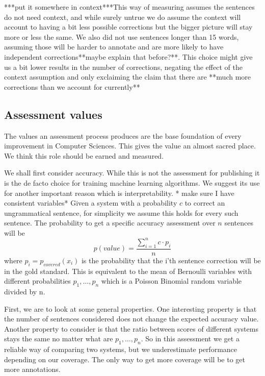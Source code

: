\documentclass[11pt]{article}
\begin{document}
{*}{*}{*}put it somewhere in context{*}{*}{*}This way of measuring
assumes the sentences do not need context, and while surely untrue
we do assume the context will account to having a bit less possible
corrections but the bigger picture will stay more or less the same.
We also did not use sentences longer than 15 words, assuming those
will be harder to annotate and are more likely to have independent
corrections{*}{*}maybe explain that before?{*}{*}. This choice might
give us a bit lower results in the number of corrections, negating
the effect of the context assumption and only exclaiming the claim
that there are {*}{*}much more corrections than we account for currently{*}{*}

\subsection{Assessment values\label{sec:Assessment-values}}

The values an assessment process produces are the base foundation of
 every improvement in Computer Sciences. This gives the value an
  almost sacred place. We think this role should be earned and measured.
 
 We shall first consider accuracy. While this is not the assessment for publishing it is the de facto choice for training machine learning algorithms. We suggest its use for another important reason which is interpretability.
{*} make sure I have consistent variables{*}
Given a system with a probability $c$ to correct an ungrammatical sentence, for simplicity we assume this holds for every such sentence. The probability to get a specific accuracy assessment over $n$ sentences will be $$p\left(value\right)=\frac{\sum_{i=1}^{n}c\cdot p_i}{n} $$ 
where $p_i=p_{covered}\left(x_i\right) $ is the probability that the i'th sentence correction will be in the gold standard. This is equivalent to the mean of Bernoulli variables with different probabilities $p_1,\ldots,p_n$ which is a Poisson Binomial random variable divided by n. 

First, we are to look at some general properties.
 One interesting property is that the number of sentences considered does not change the expected accuracy value.
 Another property to consider is that the ratio between scores of different systems stays the same no matter what are $p_1,\ldots,p_n$. So in this assessment we get a reliable way of comparing two systems, but we underestimate performance depending on our coverage. The only way to get more coverage will be to get more annotations.
 
\end{document}
